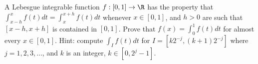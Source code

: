A Lebesgue integrable function $f:[0,1]\rightarrow \R$ has the
property that $\int_{x-h}^x f(t)dt=\int_x^{x+h}f(t)dt$ whenever $x\in
[0,1]$, and $h>0$ are such that $[x-h,x+h]$ is contained in
$[0,1]$. Prove that $f(x)=\int_0^1f(t)dt$ for almost every $x\in
[0,1]$.  Hint: compute $\int_If(t)dt$ for $I=[k2^{-j},(k+1)2^{-j}]$
where $j=1,2,3,\ldots $, and $k$ is an integer,  $k\in [0,2^j-1]$.
